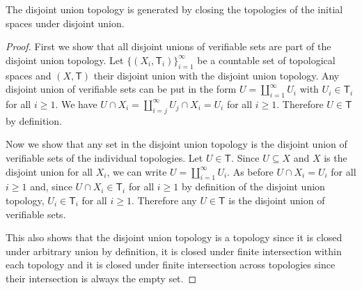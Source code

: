 \documentclass[11pt,letterpaper,fleqn]{memoir} %
\begin{document}
\begin{mathSection}
	\begin{prop}\label{prop_disjoint_union_topology_is_closure}
		The disjoint union topology is generated by closing the topologies of the initial spaces under disjoint union.
	\end{prop}
    \begin{proof}
		First we show that all disjoint unions of verifiable sets are part of the disjoint union topology. Let $\{(X_i, \mathsf{T}_i)\}_{i=1}^{\infty}$ be a countable set of topological spaces and $(X, \mathsf{T})$ their disjoint union with the disjoint union topology. Any disjoint union of verifiable sets can be put in the form $U=\coprod\limits_{i=1}^{\infty} U_i$ with $U_i \in \mathsf{T}_i$ for all $i \geq 1$. We have $U \cap X_i = \coprod\limits_{i=j}^{\infty} U_j \cap X_i = U_i$ for all $i \geq 1$. Therefore $U \in \mathsf{T}$ by definition.
		
		Now we show that any set in the disjoint union topology is the disjoint union of verifiable sets of the individual topologies. Let $U \in \mathsf{T}$. Since $U \subseteq X$ and $X$ is the disjoint union for all $X_i$, we can write $U=\coprod\limits_{i=1}^{\infty} U_i$. As before $U \cap X_i = U_i$ for all $i \geq 1$ and, since $U \cap X_i \in \mathsf{T}_i$ for all $i \geq 1$ by definition of the disjoint union topology, $U_i \in \mathsf{T}_i$ for all $i \geq 1$. Therefore any $U \in \mathsf{T}$ is the disjoint union of verifiable sets.
		
		This also shows that the disjoint union topology is a topology since it is closed under arbitrary union by definition, it is closed under finite intersection within each topology and it is closed under finite intersection across topologies since their intersection is always the empty set.
    \end{proof}


\end{mathSection}
\end{document}
